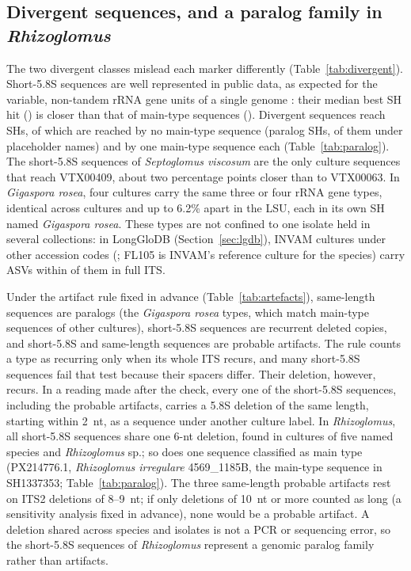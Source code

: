 \documentclass[11pt]{article}
\newcommand{\spn}[1]{\emph{#1}}   %
\begin{document}
\subsection{Divergent sequences, and a paralog family in \spn{Rhizoglomus}}\label{sec:divergent}
The two divergent classes mislead each marker differently (Table~\ref{tab:divergent}). Short-5.8S sequences are well
represented in public data, as expected for the variable, non-tandem rRNA gene units of a single genome
\cite{maeda2018rdna}: their median best SH hit (\DivSHMedian{}) is closer than that of main-type sequences
(\MainSHMedian{}). Divergent sequences reach \DivSHs{} SHs, of which \ParalogSH{} are reached by no main-type
sequence (paralog SHs, \ParalogPlaceholder{} of them under placeholder names) and \DivSHOneMain{} by one main-type
sequence each (Table~\ref{tab:paralog}). The short-5.8S sequences of \spn{Septoglomus viscosum} are the only culture
sequences that reach VTX00409, about two percentage points closer than to VTX00063. In \spn{Gigaspora rosea}, four
cultures carry the same three or four rRNA gene types, identical across cultures and up to 6.2\% apart in the LSU,
each in its own SH named \spn{Gigaspora rosea}. These types are not confined to one isolate held in several
collections: in LongGloDB (Section~\ref{sec:lgdb}), INVAM cultures under other accession codes (\LgRoseaCultures{};
FL105 is INVAM's reference culture for the species) carry ASVs within \LgRoseaMaxITS{} of them in full ITS.



Under the artifact rule fixed in advance (Table~\ref{tab:artefacts}), \ArtSameParalog{} same-length sequences are
paralogs (the \spn{Gigaspora rosea} types, which match main-type sequences of other cultures), \ArtShortRecDel{}
short-5.8S sequences are recurrent deleted copies, and \ArtShortArtefact{} short-5.8S and \ArtSameArtefact{}
same-length sequences are probable artifacts. The rule counts a type as recurring only when its whole ITS recurs,
and many short-5.8S sequences fail that test because their spacers differ. Their deletion, however, recurs. In a
reading made after the check, every one of the \NShort{} short-5.8S sequences, including the \ShDelRecurArtefact{}
probable artifacts, carries a 5.8S deletion of the same length, starting within 2~nt, as a sequence under another
culture label. In \spn{Rhizoglomus}, all \ShSixCopies{} short-5.8S sequences share one 6-nt deletion, found in
\ShSixCultures{} cultures of five named species and \spn{Rhizoglomus} sp.; so does one sequence classified as main
type (PX214776.1, \spn{Rhizoglomus irregulare} 4569\_1185B, the main-type sequence in SH1337353;
Table~\ref{tab:paralog}). The three same-length probable artifacts rest on ITS2 deletions of 8--9~nt; if only
deletions of 10~nt or more counted as long (a sensitivity analysis fixed in advance), none would be a probable
artifact. A deletion shared across species and isolates is not a PCR or sequencing error, so the short-5.8S
sequences of \spn{Rhizoglomus} represent a genomic paralog family rather than artifacts.

\end{document}
